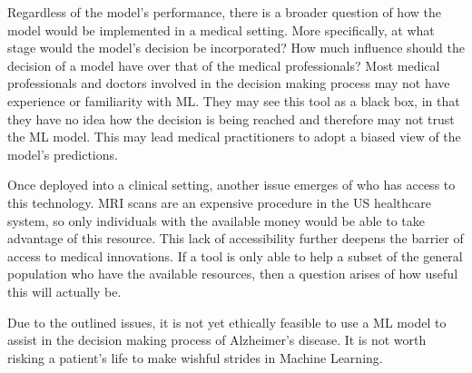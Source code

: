 \documentclass[10pt,twocolumn]{article}
\begin{document}
Regardless of the model’s performance, there is a broader question of how the model would be implemented in a medical setting. More specifically, at what stage would the model’s decision be incorporated? How much influence should the decision of a model have over that of the medical professionals? Most medical professionals and doctors involved in the decision making process may not have experience or familiarity with ML. They may see this tool as a black box, in that they have no idea how the decision is being reached and therefore may not trust the ML model. This may lead medical practitioners to adopt a biased view of the model's predictions. 

Once deployed into a clinical setting, another issue emerges of who has access to this technology. MRI scans are an expensive procedure in the US healthcare system, so only individuals with the available money would be able to take advantage of this resource. This lack of accessibility further deepens the barrier of access to medical innovations. If a tool is only able to help a subset of the general population who have the available resources, then a question arises of how useful this will actually be.

Due to the outlined issues, it is not yet ethically feasible to use a ML model to assist in the decision making process of Alzheimer’s disease. It is not worth risking a patient’s life to make wishful strides in Machine Learning. 

\printbibliography 
\end{document}
